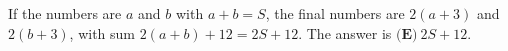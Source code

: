 If the numbers are $a$ and $b$ with $a+b=S$, the final numbers are $2(a+3)$ and $2(b+3)$, with sum $2(a+b)+12=2S+12$. The answer is $\boxed{\textbf{(E)}\ 2S+12}$.
